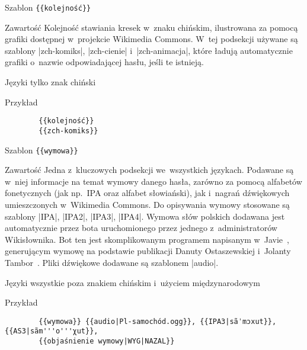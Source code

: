 \spacer
\begin{opis}
	\item[Szablon] \verb|{{kolejność}}|
	\item[Zawartość] Kolejność stawiania kresek w~znaku chińskim, ilustrowana za pomocą grafiki dostępnej w~projekcie Wikimedia Commons. W~tej podsekcji używane są szablony \kod|{{zch-komiks}}|, \kod|{{zch-cienie}}| i~\kod|{{zch-animacja}}|, które ładują automatycznie grafiki o~nazwie odpowiadającej hasłu, jeśli te istnieją.
	\item[Języki] tylko znak chiński
	\item[Przykład]
		\begin{verbatim}
		{{kolejność}}
		{{zch-komiks}}
		\end{verbatim}
\end{opis}
\spacer
\begin{opis}
	\item[Szablon] \verb|{{wymowa}}|
	\item[Zawartość] Jedna z~kluczowych podsekcji we~wszystkich językach. Podawane są w~niej informacje na temat wymowy danego hasła, zarówno za pomocą alfabetów fonetycznych (jak np.\ IPA oraz alfabet słowiański), jak i~nagrań dźwiękowych umieszczonych w~Wikimedia Commons. Do opisywania wymowy stosowane są szablony \kod|{{IPA}}|, \kod|{{IPA2}}|, \kod|{{IPA3}}|, \kod|{{IPA4}}|. Wymowa słów polskich dodawana jest automatycznie przez bota uruchomionego przez jednego z~administratorów Wikisłownika. Bot ten jest skomplikowanym programem napisanym w~Javie~\cite{wikt:olafbot}, generującym wymowę na podstawie publikacji Danuty Ostaszewskiej i~Jolanty Tambor~\cite{fonetyka}.
	Pliki dźwiękowe dodawane są szablonem \kod|{{audio}}|.
	\item[Języki] wszystkie poza znakiem chińskim i~użyciem międzynarodowym
	\item[Przykład]
		\begin{verbatim}
		{{wymowa}} {{audio|Pl-samochód.ogg}}, {{IPA3|sãˈmɔxut}}, {{AS3|sãm'''o'''χut}},
		{{objaśnienie wymowy|WYG|NAZAL}}
		\end{verbatim}
\end{opis}
\spacer
